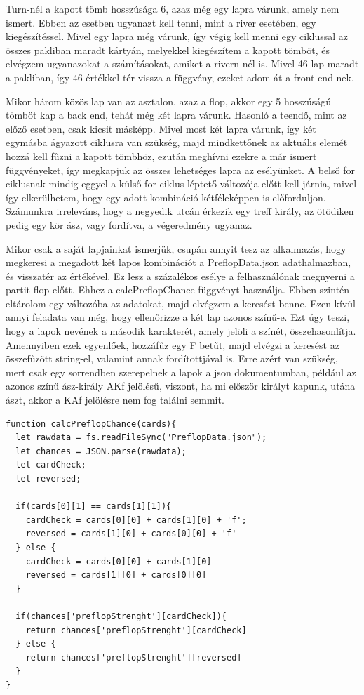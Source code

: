 Turn-nél a kapott tömb hosszúsága 6, azaz még egy lapra várunk, amely nem ismert. Ebben az esetben ugyanazt kell tenni, mint a river esetében, egy kiegészítéssel. Mivel egy lapra még várunk, így végig kell menni egy ciklussal az összes pakliban maradt kártyán, melyekkel kiegészítem a kapott tömböt, és elvégzem ugyanazokat a számításokat, amiket a rivern-nél is. Mivel 46 lap maradt a pakliban, így 46 értékkel tér vissza a függvény, ezeket adom át a front end-nek.

Mikor három közös lap van az asztalon, azaz a flop, akkor egy 5 hosszúságú tömböt kap a back end, tehát még két lapra várunk.  Hasonló a teendő, mint az előző esetben, csak kicsit másképp. Mivel most két lapra várunk, így két egymásba ágyazott ciklusra van szükség, majd mindkettőnek az aktuális elemét hozzá kell fűzni a kapott tömbhöz, ezután meghívni ezekre a már ismert függvényeket, így megkapjuk az összes lehetséges lapra az esélyünket. A belső for ciklusnak mindig eggyel a külső for ciklus léptető változója előtt kell járnia, mivel így elkerülhetem, hogy egy adott kombináció kétféleképpen is előforduljon. Számunkra irreleváns, hogy a negyedik utcán érkezik egy treff király, az ötödiken pedig egy kör ász, vagy fordítva, a végeredmény ugyanaz.

Mikor csak a saját lapjainkat ismerjük, csupán annyit tesz az alkalmazás, hogy megkeresi a megadott két lapos kombinációt a PreflopData.json adathalmazban, és visszatér az értékével. Ez lesz a százalékos esélye a felhasználónak megnyerni a partit flop előtt. Ehhez a calcPreflopChance függvényt használja. Ebben szintén eltárolom egy változóba az adatokat, majd elvégzem a keresést benne. Ezen kívül annyi feladata van még, hogy ellenőrizze a két lap azonos színű-e. Ezt úgy teszi, hogy a lapok nevének a második karakterét, amely jelöli a színét, összehasonlítja. Amennyiben ezek egyenlőek, hozzáfűz egy F betűt, majd elvégzi a keresést az összefűzött string-el, valamint annak fordítottjával is. Erre azért van szükség, mert csak egy sorrendben szerepelnek a lapok a json dokumentumban, például az azonos színű ász-király AKf jelölésű, viszont, ha mi először királyt kapunk, utána ászt, akkor a KAf jelölésre nem fog találni semmit.

\begin{lstlisting}[style=htmlcssjs]
function calcPreflopChance(cards){
  let rawdata = fs.readFileSync("PreflopData.json");
  let chances = JSON.parse(rawdata);
  let cardCheck;
  let reversed;

  if(cards[0][1] == cards[1][1]){
    cardCheck = cards[0][0] + cards[1][0] + 'f';
    reversed = cards[1][0] + cards[0][0] + 'f'
  } else {
    cardCheck = cards[0][0] + cards[1][0]
    reversed = cards[1][0] + cards[0][0] 
  }

  if(chances['preflopStrenght'][cardCheck]){
    return chances['preflopStrenght'][cardCheck]
  } else {
    return chances['preflopStrenght'][reversed]
  }
}
\end{lstlisting}

